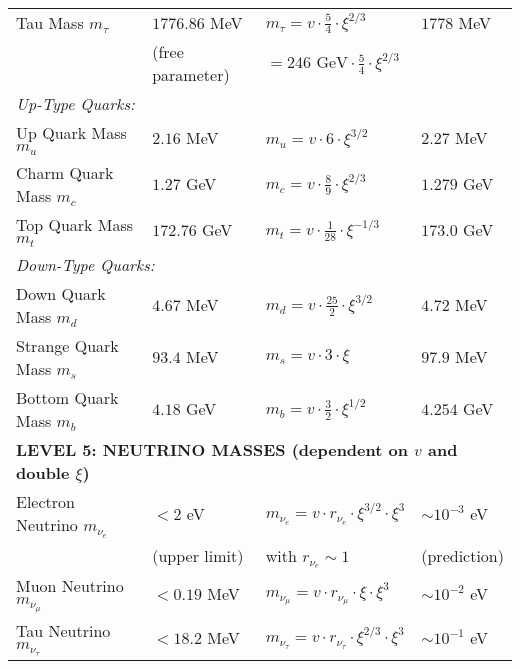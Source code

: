 \documentclass[12pt,a4paper]{article}
\begin{document}
\begin{longtable}{p{4.5cm}p{3.5cm}p{3.5cm}p{3.5cm}}
		Tau Mass $m_\tau$ & $1776.86$ MeV & $m_\tau = v \cdot \frac{5}{4} \cdot \xi^{2/3}$ & $1778$ MeV \\
		& (free parameter) & $= 246 \text{ GeV} \cdot \frac{5}{4} \cdot \xi^{2/3}$ & \\[0.3em]
		
		\multicolumn{4}{l}{\textit{Up-Type Quarks:}} \\
		
		Up Quark Mass $m_u$ & $2.16$ MeV & $m_u = v \cdot 6 \cdot \xi^{3/2}$ & $2.27$ MeV \\
		
		Charm Quark Mass $m_c$ & $1.27$ GeV & $m_c = v \cdot \frac{8}{9} \cdot \xi^{2/3}$ & $1.279$ GeV \\
		
		Top Quark Mass $m_t$ & $172.76$ GeV & $m_t = v \cdot \frac{1}{28} \cdot \xi^{-1/3}$ & $173.0$ GeV \\
		
		\multicolumn{4}{l}{\textit{Down-Type Quarks:}} \\
		
		Down Quark Mass $m_d$ & $4.67$ MeV & $m_d = v \cdot \frac{25}{2} \cdot \xi^{3/2}$ & $4.72$ MeV \\
		
		Strange Quark Mass $m_s$ & $93.4$ MeV & $m_s = v \cdot 3 \cdot \xi$ & $97.9$ MeV \\
		
		Bottom Quark Mass $m_b$ & $4.18$ GeV & $m_b = v \cdot \frac{3}{2} \cdot \xi^{1/2}$ & $4.254$ GeV \\
		
		\midrule
		\multicolumn{4}{l}{\textbf{LEVEL 5: NEUTRINO MASSES (dependent on $v$ and double $\xi$)}} \\
		\midrule
		
		Electron Neutrino $m_{\nu_e}$ & $< 2$ eV & $m_{\nu_e} = v \cdot r_{\nu_e} \cdot \xi^{3/2} \cdot \xi^3$ & $\sim 10^{-3}$ eV \\
		& (upper limit) & with $r_{\nu_e} \sim 1$ & (prediction) \\[0.3em]
		
		Muon Neutrino $m_{\nu_\mu}$ & $< 0.19$ MeV & $m_{\nu_\mu} = v \cdot r_{\nu_\mu} \cdot \xi \cdot \xi^3$ & $\sim 10^{-2}$ eV \\
		
		Tau Neutrino $m_{\nu_\tau}$ & $< 18.2$ MeV & $m_{\nu_\tau} = v \cdot r_{\nu_\tau} \cdot \xi^{2/3} \cdot \xi^3$ & $\sim 10^{-1}$ eV \\
		

\end{longtable}
\end{document}

